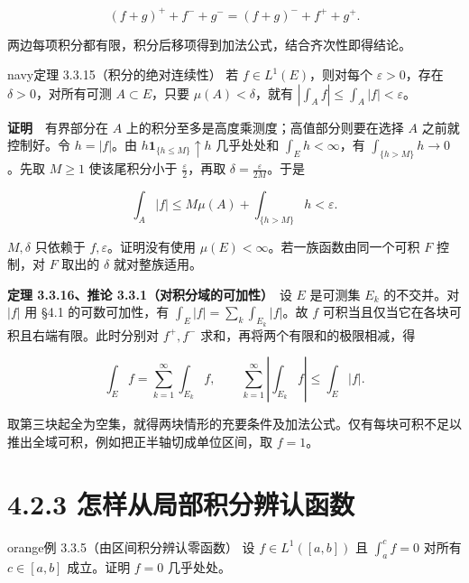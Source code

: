 \documentclass[11pt,a4paper]{article}
\begin{document}
\begin{equation*}
(f+g)^++f^-+g^-=(f+g)^-+f^++g^+ .
\end{equation*}

两边每项积分都有限，积分后移项得到加法公式，结合齐次性即得结论。

\begin{sboxenv}{navy}{定理 3.3.15（积分的绝对连续性）}
若 \(f\in L^1(E)\)，则对每个 \(\varepsilon>0\)，存在
\(\delta>0\)，对所有可测 \(A\subset E\)，只要 \(\mu(A)<\delta\)，就有
\(\left|\int_A f\right|\le\int_A|f|<\varepsilon\)。

\end{sboxenv}

\textbf{证明}　有界部分在 \(A\)
上的积分至多是高度乘测度；高值部分则要在选择 \(A\) 之前就控制好。令
\(h=|f|\)。由 \(h\mathbf1_{\{h\le M\}}\uparrow h\) 几乎处处和
\(\int_E h<\infty\)，有 \(\int_{\{h>M\}}h\to0\)。先取 \(M\ge1\)
使该尾积分小于 \(\frac{\varepsilon}{2}\)，再取
\(\delta=\frac{\varepsilon}{2M}\)。于是

\begin{equation*}
\int_A|f|\le M\mu(A)+\int_{\{h>M\}}h<\varepsilon .\tag{4.2.2}
\end{equation*}

\(M,\delta\) 只依赖于 \(f,\varepsilon\)。证明没有使用
\(\mu(E)<\infty\)。若一族函数由同一个可积 \(F\) 控制，对 \(F\) 取出的
\(\delta\) 就对整族适用。

\textbf{定理 3.3.16、推论 3.3.1（对积分域的可加性）}　设 \(E\) 是可测集
\(E_k\) 的不交并。对 \(|f|\) 用 §4.1 的可数可加性，有
\(\int_E|f|=\sum_k\int_{E_k}|f|\)。故 \(f\)
可积当且仅当它在各块可积且右端有限。此时分别对 \(f^+,f^-\)
求和，再将两个有限和的极限相减，得

\begin{equation*}
\int_E f=\sum_{k=1}^{\infty}\int_{E_k}f,\qquad
\sum_{k=1}^{\infty}\left|\int_{E_k}f\right|\le\int_E|f|.
\end{equation*}

取第三块起全为空集，就得两块情形的充要条件及加法公式。仅有每块可积不足以推出全域可积，例如把正半轴切成单位区间，取
\(f=1\)。

\clearpage\section[\S{}4.2.3
怎样从局部积分辨认函数]{4.2.3
怎样从局部积分辨认函数}\label{ux600eux6837ux4eceux5c40ux90e8ux79efux5206ux8fa8ux8ba4ux51fdux6570}

\begin{sboxenv}{orange}{例 3.3.5（由区间积分辨认零函数）}
设 \(f\in L^1([a,b])\) 且 \(\int_a^c f=0\) 对所有 \(c\in[a,b]\)
成立。证明 \(f=0\) 几乎处处。

\end{sboxenv}
\end{document}
